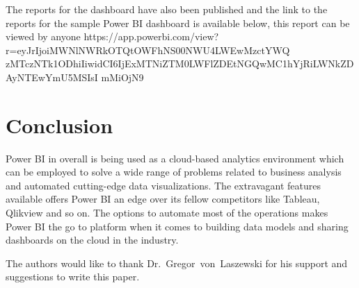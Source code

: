 The reports for the dashboard have also been published and the link to the 
reports for the sample Power BI dashboard is available below, this report 
can be viewed by anyone
https://app.powerbi.com/view?r=eyJrIjoiMWNlNWRkOTQtOWFhNS00NWU4LWEwMzctYWQ
zMTczNTk1ODhiIiwidCI6IjExMTNiZTM0LWFlZDEtNGQwMC1hYjRiLWNkZDAyNTEwYmU5MSIsI
mMiOjN9

 
\section{Conclusion}
Power BI in overall is being used as a cloud-based analytics environment which 
can be employed to solve a wide range of problems related to business analysis 
and automated cutting-edge data visualizations. The extravagant features 
available offers Power BI an edge over its fellow competitors like Tableau, 
Qlikview and so on. The options to automate most of the operations makes 
Power BI the go to platform when it comes to building data models and sharing 
dashboards on the cloud in the industry.
 

\begin{acks}

The authors would like to thank Dr.~Gregor~von~Laszewski for his
support and suggestions to write this paper.

\end{acks}


 

